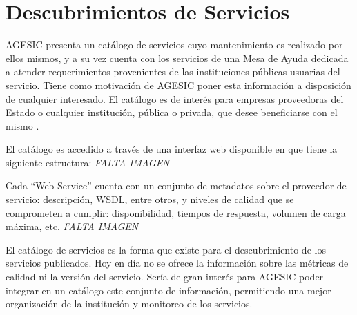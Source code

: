 \section{Descubrimientos de Servicios}
\label{Analisis:Catalogo}
AGESIC presenta un catálogo de servicios cuyo mantenimiento es realizado por ellos mismos, y a su vez cuenta con los servicios de una Mesa de Ayuda dedicada a atender requerimientos provenientes de las instituciones públicas usuarias del servicio. Tiene como motivación de AGESIC poner esta información a disposición de cualquier interesado. El catálogo es de  interés para empresas proveedoras del Estado o cualquier institución, pública o privada, que  desee beneficiarse con el mismo \cite{Agesic:Catalogo}.

El catálogo es accedido a través de una interfaz web disponible en \cite{Agesic:Catalogo} que tiene la siguiente estructura:
\emph{FALTA IMAGEN}

Cada “Web Service” cuenta con un conjunto de metadatos sobre el proveedor de servicio: descripción, WSDL, entre otros, y niveles de calidad que se comprometen a cumplir: disponibilidad, tiempos de respuesta, volumen de carga máxima, etc.
\emph{FALTA IMAGEN}

El catálogo de servicios es la forma que existe para el descubrimiento de los servicios publicados. Hoy en día no se ofrece la información sobre las métricas de calidad ni la versión del servicio. Sería de gran interés para AGESIC poder integrar en un catálogo este conjunto de información, permitiendo una mejor  organización de la institución y monitoreo de los servicios.